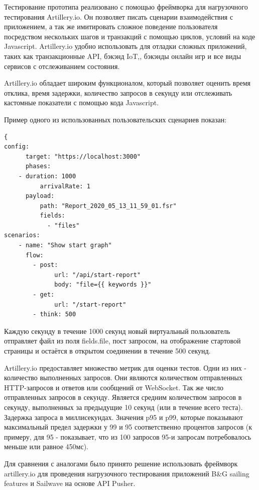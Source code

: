 Тестирование прототипа реализовано с помощью фреймворка для нагрузочного тестирования Artillery.io. Он позволяет писать сценарии взаимодействия с приложением, а так же имитировать сложное поведение пользователя посредством нескольких шагов и транзакций с помощью циклов, условий на коде Javascript. Artillery.io удобно использовать для отладки сложных приложений, таких как транзакционные API, бэкэнд IoT,, бэкэнды онлайн игр и все виды сервисов с отслеживанием состояния.

Artillery.io обладает широким функционалом, который позволяет оценить время отклика, время задержки, количество запросов в секунду или отслеживать кастомные показатели с помощью кода Javascript.

Пример одного из использованных пользовательских сценариев показан:

\begin{lstlisting}
{
config:
	  target: "https://localhost:3000"
	  phases:
	- duration: 1000
		  arrivalRate: 1 
	  payload:
		  path: "Report_2020_05_13_11_59_01.fsr"
		  fields:
			- "files"
scenarios:
	- name: "Show start graph"
	  flow:
		- post:
			  url: "/api/start-report"
			  body: "file={{ keywords }}"
		- get:
			  url: "/start-report"
		- think: 500
\end{lstlisting}

Каждую секунду в течение 1000 секунд новый виртуальный пользователь отправляет файл из поля fields.file, пост запросом, на отображение стартовой страницы и остаётся в открытом соединении в течение 500 секунд.

Artillery.io предоставляет множество метрик для оценки тестов. Одни из них - количество выполненных запросов. Они являются количеством отправленных HTTP-запросов и ответов или сообщений от WebSocket. Так же число отправленных запросов в секунду. Является средним количеством запросов в секунду, выполненных за предыдущие 10 секунд (или в течение всего теста). Задержка запроса в миллисекундах. Значения p95 и p99, которые показывают максимальный предел задержки у 99 и 95 соответственно процентов запросов (к примеру, для 95 - показывает, что из 100 запросов 95-и запросам потребовалось меньше или равное 450мс).

Для сравнения с аналогами было принято решение использовать фреймворк artillery.io для проведения нагрузочного тестирования приложений B\&G sailing features и Sailwave на основе API Pusher.

